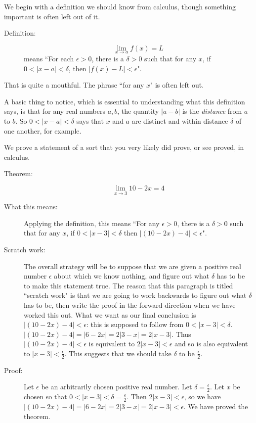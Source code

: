 \documentclass[12pt]{article}
\begin{document}
We begin with a definition we should know from calculus, though something important is often left out of it.

\begin{description}

\item[Definition:]  $$\lim_{x \rightarrow a}f(x)=L$$ means ``For each $\epsilon >0$, there is a $\delta>0$ such that for any $x$, if $0<|x-a|<\delta$, then $|f(x)-L|<\epsilon$".

\end{description}

That is quite a mouthful.  The phrase ``for any $x$" is often left out.

A basic thing to notice, which is essential to understanding what this definition says, is that for any real numbers
$a,b$, the quantity $|a-b|$ is the {\em distance\/} from $a$ to $b$.  So $0<|x-a|<\delta$ says that $x$ and $a$ are distinct and within distance $\delta$ of one another, for example.

We prove a statement of a sort that you very likely did prove, or see proved, in calculus.

\begin{description}

\item[Theorem:]  $$\lim_{x \rightarrow 3} 10-2x = 4$$

\item[What this means:]  Applying the definition, this means ``For any $\epsilon>0$, there is a $\delta>0$ such that for any $x$, if $0<|x-3|<\delta$ then $|(10-2x)-4|<\epsilon$".

\item[Scratch work:]  The overall strategy will be to suppose that we are given a positive real number $\epsilon$ about which we know nothing, and figure out what $\delta$ has to be to make this statement true.  The reason that this paragraph is titled ``scratch work" is that we are going to work backwards to figure out what $\delta$ has to be, then write the proof in the forward direction when we have worked this out.  What we want as our final conclusion is $|(10-2x)-4|<\epsilon$:  this is supposed to follow from $0<|x-3|<\delta$.  $|(10-2x)-4|=|6-2x| = 2|3-x|=2|x-3|$.
Thus $|(10-2x)-4|<\epsilon$ is equivalent to $2|x-3|<\epsilon$ and so is also equivalent to $|x-3|<\frac{\epsilon}2$.
This suggests that we should take $\delta$ to be $\frac{\epsilon}2$.

\item[Proof:]  Let $\epsilon$ be an arbitrarily chosen positive real number.  Let $\delta = \frac{\epsilon}2$.
Let $x$ be chosen so that $0<|x-3|<\delta=\frac{\epsilon}2$.  Then $2|x-3|<\epsilon$, so we have
$|(10-2x)-4| = |6-2x| = 2|3-x| = 2|x-3|<\epsilon$.  We have proved the theorem.

\end{description}
\end{document}
